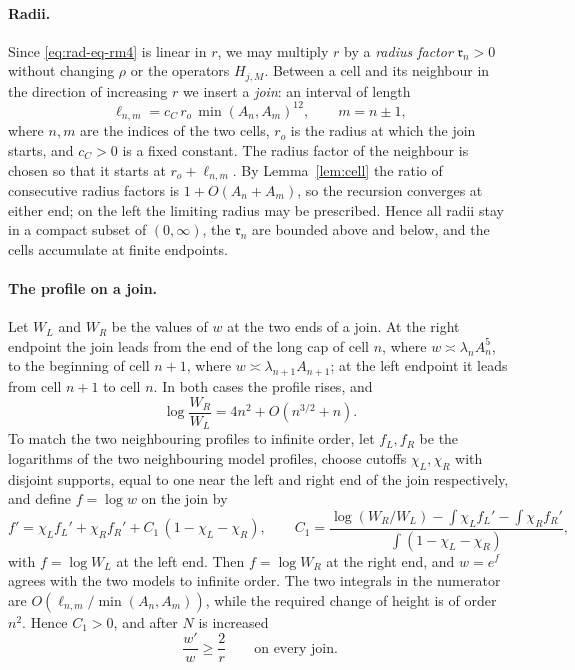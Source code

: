 \paragraph{Radii.}
Since \eqref{eq:rad-eq-rm4} is linear in $r$, we may multiply $r$ by a
\emph{radius factor} $\mathfrak r_n>0$ without changing $\rho$ or the
operators $H_{j,M}$. Between a cell and its neighbour in the direction
of increasing $r$ we insert a \emph{join}: an interval of length
\begin{equation}\label{eq:rad-eq-rm7}
 \ell_{n,m}=c_C\,r_o\,\min(A_n,A_m)^{12},\qquad m=n\pm1,
\end{equation}
where $n,m$ are the indices of the two cells, $r_o$ is the radius at
which the join starts, and $c_C>0$ is a fixed constant. The radius
factor of the neighbour is chosen so that it starts at $r_o+\ell_{n,m}$.
By Lemma~\ref{lem:cell} the ratio of consecutive radius factors is
$1+O(A_n+A_m)$, so the recursion converges at either end; on the left
the limiting radius may be prescribed. Hence all radii stay in a
compact subset of $(0,\infty)$, the $\mathfrak r_n$ are bounded above
and below, and the cells accumulate at finite endpoints.

\paragraph{The profile on a join.}
Let $W_L$ and $W_R$ be the values of $w$ at the two ends of a join.
At the right endpoint the join leads from the end of the long cap of
cell $n$, where $w\asymp\lambda_nA_n^5$, to the beginning of cell
$n+1$, where $w\asymp\lambda_{n+1}A_{n+1}$; at the left endpoint it
leads from cell $n+1$ to cell $n$. In both cases the profile rises,
and
\begin{equation}\label{eq:height-contrast-new}
 \log\frac{W_R}{W_L}=4n^2+O(n^{3/2}+n).
\end{equation}
To match the two neighbouring profiles to infinite order, let
$f_L,f_R$ be the logarithms of the two neighbouring model profiles,
choose cutoffs $\chi_L,\chi_R$ with disjoint supports, equal to one
near the left and right end of the join respectively, and define
$f=\log w$ on the join by
\begin{equation}\label{eq:rad-eq-rm8}
 f'=\chi_Lf_L'+\chi_Rf_R'+C_1\,(1-\chi_L-\chi_R),
 \qquad
 C_1=\frac{\log(W_R/W_L)-\int\chi_Lf_L'-\int\chi_Rf_R'}
             {\int(1-\chi_L-\chi_R)},
\end{equation}
with $f=\log W_L$ at the left end. Then $f=\log W_R$ at the right end,
and $w=e^f$ agrees with the two models to infinite order. The two
integrals in the numerator are $O(\ell_{n,m}/\min(A_n,A_m))$, while the
required change of height is of order $n^2$. Hence $C_1>0$, and after
$N$ is increased
\begin{equation}\label{eq:join-slope}
 \frac{w'}{w}\ge\frac2r\qquad\text{on every join.}
\end{equation}

